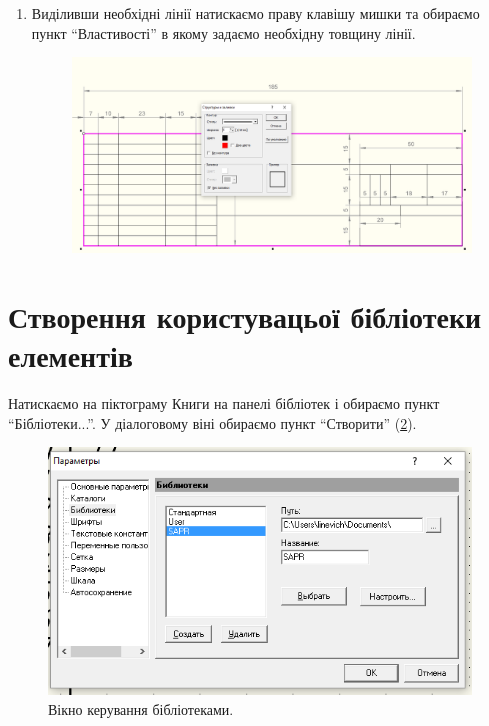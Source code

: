 \begin{enumerate}[leftmargin=*]
  \FloatBarrier
\item Виділивши необхідні лінії натискаємо праву клавішу мишки та обираємо пункт ``Властивості'' в
  якому задаємо необхідну товщину лінії.
  \begin{figure}[!htb]
    \centering \includegraphics[width=0.9\linewidth]{./images/lab2/bold_line.png}
    \caption{}
    \label{fig:lab2:nineth_step}
  \end{figure}
  \FloatBarrier
  
\end{enumerate}

\FloatBarrier
\section{Створення користувацьої бібліотеки елементів}

Натискаємо на піктограму Книги на панелі бібліотек і обираємо пункт ``Бібліотеки...''. У діалоговому
віні обираємо пункт ``Створити'' (\ref{fig:lab2:create_library}).
\begin{figure}[!htb]
  \centering \includegraphics[width=0.9\linewidth]{./images/lab2/new_library.png}
  \caption{Вікно керування бібліотеками.}
  \label{fig:lab2:create_library}
\end{figure}
\FloatBarrier

